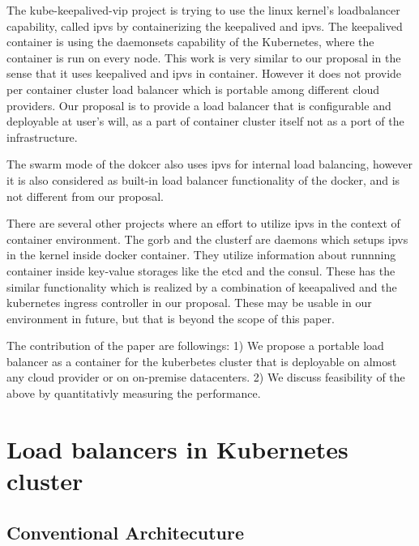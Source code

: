 The kube-keepalived-vip\cite{Prashanth2016} project is trying to use the linux kernel's loadbalancer capability, 
called ipvs\cite{Zhang2000} by containerizing the keepalived\cite{ACassen2016} and ipvs. 
The keepalived container is using the daemonsets\cite{K8sDaemonsets2017} capability of the Kubernetes, 
where the container is run on every node.
This work is very similar to our proposal in the sense that it uses keepalived and ipvs in container. However it does not provide 
per container cluster load balancer which is portable among different cloud providers.   
Our proposal is to provide a load balancer that is configurable and deployable at user's will,
 as a part of container cluster itself not as a port of the infrastructure.  

The swarm mode of the dokcer\cite{DockerCoreEngineering2016,DockerInc2017} also uses ipvs for internal load balancing,
however it is also considered as built-in load balancer functionality of the docker, 
and is not different from our proposal.

There are several other projects where an effort to utilize ipvs in the context of container environment.
The gorb\cite{Sibiryov2015} and the clusterf\cite{Aaltodoc:http://urn.fi/URN:NBN:fi:aalto-201611025433} are daemons 
which setups ipvs in the kernel inside docker container. They utilize information about runnning container inside key-value storages
like the etcd\cite{CoreOSEtcd} and the consul\cite{HashiCorpConsul}. 
These has the similar functionality which is realized by a combination of keeapalived and the kubernetes ingress controller in our proposal.
These may be usable in our environment in future, but that is beyond the scope of this paper.

The contribution of the paper are followings: 
1) We propose a portable load balancer as a container for the kuberbetes cluster 
that is deployable on almost any cloud provider or on on-premise datacenters.
2) We discuss feasibility of the above by quantitativly measuring the performance.


\section{Load balancers in Kubernetes cluster}\label{Load balancers in Kubernetes cluster}

\subsection{Conventional Architecuture}


